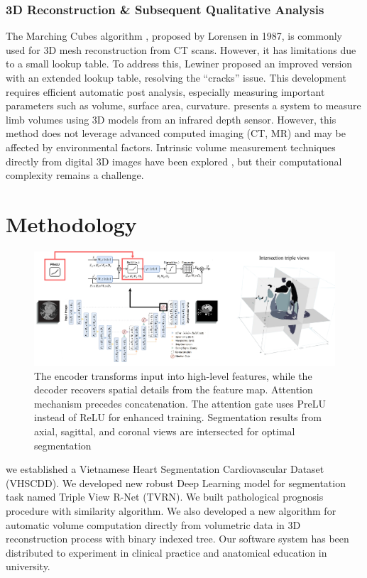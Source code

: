 \documentclass{article}
\begin{document}
\begin{multicols}{2}
\subsubsection{3D Reconstruction \& Subsequent Qualitative Analysis}
The Marching Cubes algorithm \cite{loren}, proposed by Lorensen in 1987, is commonly used for 3D mesh reconstruction from CT scans. However, it has limitations due to a small lookup table. To address this, Lewiner \cite{lewiner} proposed an improved version with an extended lookup table, resolving the “cracks” issue. This development requires efficient automatic
post analysis, especially measuring important parameters such as volume, surface area, curvature. \cite{limb} presents a system to measure limb volumes using 3D models from an infrared depth sensor. However,
this method does not leverage advanced computed imaging (CT, MR) and may be affected by environmental factors. Intrinsic volume measurement techniques directly from digital 3D images have been explored \cite{intrinsic}, but their computational complexity remains a challenge. 


\section{Methodology}

\begin{figure}
    \centering
    \includegraphics[width=1\textwidth]{figures/Model Architecture.png}
    \caption{The encoder transforms input into high-level features, while the decoder recovers spatial details from the feature map. Attention mechanism precedes concatenation. The attention gate uses PreLU instead of ReLU for enhanced training. Segmentation results from axial, sagittal, and coronal views are intersected for optimal segmentation}
    \label{fig:1}
\end{figure}

we established a Vietnamese Heart Segmentation Cardiovascular Dataset (VHSCDD). We developed new robust Deep Learning model for segmentation task named Triple View R-Net (TVRN). We built pathological prognosis procedure with similarity algorithm. We also developed a new algorithm for automatic volume computation directly from volumetric data in 3D reconstruction process with binary indexed tree. Our software system has been distributed to experiment in clinical practice and anatomical education in university.


\end{multicols}
\end{document}
